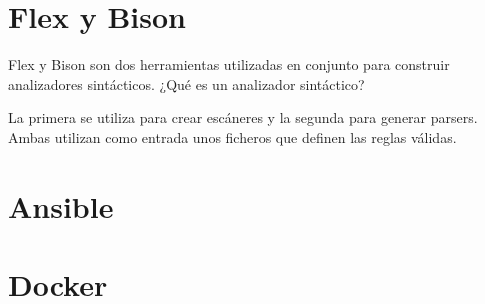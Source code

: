 \section{Flex y Bison}

Flex y Bison son dos herramientas utilizadas en conjunto para construir analizadores sintácticos. ¿Qué es un analizador sintáctico?

La primera se utiliza para crear escáneres y la segunda para generar parsers. Ambas utilizan como entrada unos ficheros que definen las reglas válidas.

\section{Ansible}



\section{Docker}




